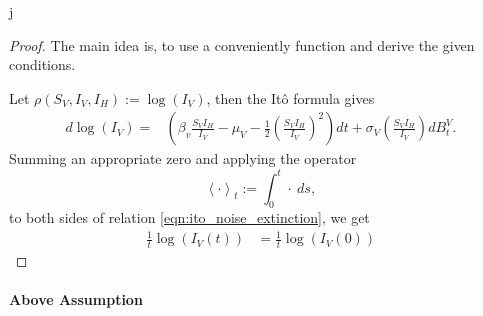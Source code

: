 j\documentclass{amsart}
\theoremstyle{plain}
\theoremstyle{definition}
\begin{document}
        \begin{proof}
            The main idea is, to use a conveniently function and derive the 
            given conditions. 
            
            Let $\rho (S_V, I_V, I_H):= \log (I_V)$, then the It\^{o} formula 
            gives
            \begin{equation} \label{eqn:ito_noise_extinction}
                \begin{aligned}
                    d \log(I_V) = & 
                        \left(
                            \beta_v \frac{S_V I_H}{ I_V} - \mu_V
                            - \frac{1}{2}
                            \left(
                                \frac{S_V I_H}{I_V}
                            \right) ^ 2
                        \right) dt
                         + \sigma_V 
                        \left(
                            \frac{S_V I_H}{ I_V}
                        \right) dB_t ^ V.
                \end{aligned}
            \end{equation}
            Summing an appropriate zero and applying the operator
            $$
                \left < \cdot \right >_t
                := 
                \int_{0} ^ t
                    \cdot \ ds,
            $$
            to both sides of relation \eqref{eqn:ito_noise_extinction}, we get
            \begin{equation} \label{eqn:applying_mean_opeartor}
                \begin{aligned}
                    \frac{1}{t} \log(I_V(t))
                    &=
                    \frac{1}{t} \log(I_V(0))
                \end{aligned}
            \end{equation}
        \end{proof}
%
%
%
%
    \paragraph{Above Assumption}
\end{document}
